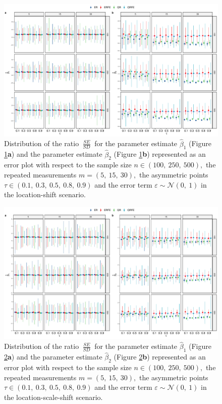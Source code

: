 \documentclass[15pt,a4paper]{article}
\DeclareMathOperator{\SE}{\textit{SE}}
\DeclareMathOperator{\SD}{\textit{SD}}
\begin{document}
\begin{figure}[hbt!]
\centering
\includegraphics[width=0.75\linewidth]{Graph_main/SdSe_norm_homo}
    \caption{Distribution of the ratio $\frac{\SE}{\SD}$ for the parameter estimate $\widehat{\beta}_1$ (Figure \ref{fig:SdSe_norm_homo}\textbf{a}) and the parameter estimate $\widehat{\beta}_2$ (Figure \ref{fig:SdSe_norm_homo}\textbf{b}) represented as an error plot with respect to the sample size $n\in(100,  \ 250,  \ 500),$ the repeated measurements $m=(5,\ 15,\ 30),$ the asymmetric points $\tau\in (0.1,  \ 0.3,  \  0.5, \  0.8,\ 0.9)$ and the error term $\varepsilon\sim\mathcal{N}(0, \ 1)$ in the location-shift scenario.} \label{fig:SdSe_norm_homo}
\end{figure}

\begin{figure}[hbt!]
\centering
\includegraphics[width=0.75\linewidth]{Graph_main/SdSe_norm_hetero}
    \caption{Distribution of the ratio $\frac{\SE}{\SD}$ for the parameter estimate $\widehat{\beta}_1$ (Figure \ref{fig:SdSe_norm_hetero}\textbf{a}) and the parameter estimate $\widehat{\beta}_2$ (Figure \ref{fig:SdSe_norm_hetero}\textbf{b}) represented as an error plot with respect to the sample size $n\in(100,  \ 250,  \ 500),$ the repeated measurements $m=(5,\ 15,\ 30),$ the asymmetric points $\tau\in (0.1,  \ 0.3,  \  0.5, \  0.8,\ 0.9)$ and the error term $\varepsilon\sim\mathcal{N}(0, \ 1)$ in the location-scale-shift scenario.} \label{fig:SdSe_norm_hetero}
\end{figure}
\end{document}
